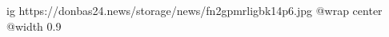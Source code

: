  
 
 
 
 

\ifcmt
  ig https://donbas24.news/storage/news/fn2gpmrligbk14p6.jpg
  @wrap center
  @width 0.9
\fi
